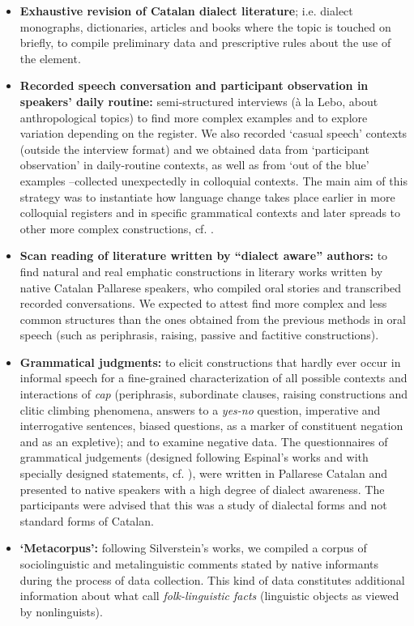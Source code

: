 \documentclass[output=paper]{LSP/langsci}
\begin{document}
\begin{itemize}
\item \textbf{Exhaustive revision of Catalan dialect literature}; i.e. dialect monographs, dictionaries, articles and books where the topic is touched on briefly, to compile preliminary data and prescriptive rules about the use of the element.
\item \textbf{Recorded speech conversation and participant observation in speakers’ daily routine: }semi-structured interviews\textbf{ }(à la Lebo, about anthropological topics) to find more complex examples and to explore variation depending on the register. We also recorded ‘casual speech’ contexts (outside the interview format) and we obtained data from ‘participant observation’ in daily-routine contexts, as well as from ‘out of the blue’ examples –collected unexpectedly in colloquial contexts. The main aim of this strategy was to instantiate how language change takes place earlier in more colloquial registers and in specific grammatical contexts and later spreads to other more complex constructions, cf. \citet[§3.4]{roberts_diachronic_2007}.
\item \textbf{Scan reading of literature written by “dialect aware” authors: }to find natural and real emphatic constructions in literary works written by native Catalan Pallarese speakers, who compiled oral stories and transcribed recorded conversations. We expected to attest find more complex and less common structures than the ones obtained from the previous methods in oral speech (such as periphrasis, raising, passive and factitive constructions). 
\item \textbf{Grammatical judgments:} to elicit constructions that hardly ever occur in informal speech for a fine-grained characterization of all possible contexts and interactions of \textit{cap} (periphrasis, subordinate clauses, raising constructions and clitic climbing phenomena, answers to a \textit{yes-no} question, imperative and interrogative sentences, biased questions, as a marker of constituent negation and as an expletive); and to examine negative data. The questionnaires of grammatical judgements (designed following Espinal’s works and with specially designed statements, cf. \citealt{espinal_two_1993,espinal_negacio_2002}), were written in Pallarese Catalan and presented to native speakers with a high degree of dialect awareness. The participants were advised that this was a study of dialectal forms and not standard forms of Catalan. 
\item \textbf{`Metacorpus': }following Silverstein’s works, we compiled a corpus of sociolinguistic and metalinguistic comments stated by native informants during the process of data collection. This kind of data constitutes additional information about what \citet{niedzielski_folk_1999} call \textit{folk-linguistic facts} (linguistic objects as viewed by nonlinguists).
\end{itemize}
\end{document}
